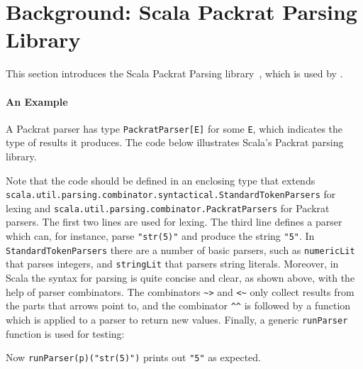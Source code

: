\section{Background: Scala Packrat Parsing Library}\label{sec:packratparsers}


This section introduces the Scala Packrat Parsing library~\cite{}, which is
used by \name.

\paragraph{An Example}
A Packrat parser has type \lstinline{PackratParser[E]} for some
\lstinline{E}, which indicates the type of results it produces.
The code below illustrates
Scala's Packrat parsing library.

\noindent

Note that the code should be defined in an enclosing type that extends
\lstinline{scala.util.parsing.combinator.syntactical.StandardTokenParsers}
for lexing and
\lstinline{scala.util.parsing.combinator.PackratParsers} for Packrat
parsers.
The first two lines are used for lexing. The third line defines a
parser which can, for instance, parse \lstinline{"str(5)"} and produce
the string \lstinline{"5"}. In \lstinline{StandardTokenParsers} there
are a number of basic parsers, such as \lstinline{numericLit} that
parses integers, and \lstinline{stringLit} that parsers string
literals. Moreover, in Scala the syntax for parsing
is quite concise and clear, as shown above, with the help of
parser combinators. The combinators \lstinline{~>} and \lstinline{<~} only collect
results from the parts that arrows point to, and the combinator \lstinline{^^} is
followed by a function which is applied to a parser to return new
values. Finally, a generic \lstinline{runParser}
function is used for testing:

Now \lstinline{runParser(p)("str(5)")} prints out \lstinline{"5"} as expected.

